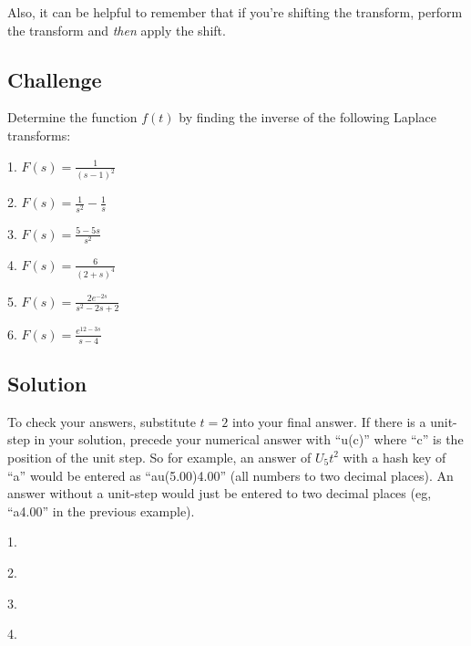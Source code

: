 Also, it can be helpful to remember that if you're shifting the transform, perform the transform and \emph{then} apply the shift.

\subsection*{Challenge}
Determine the function $f(t)$ by finding the inverse of the following Laplace transforms:

1. $\displaystyle F(s)=\frac{1}{(s-1)^2}$

2. $\displaystyle F(s)=\frac{1}{s^2} - \frac{1}{s}$


3. $\displaystyle F(s)=\frac{5-5s}{s^2}$

4. $\displaystyle F(s)=\frac{6}{(2+s)^4}$


5. $\displaystyle F(s)=\frac{2 e^{-2s}}{s^2-2s+2}$

6. $\displaystyle F(s)=\frac{e^{12-3s}}{s-4}$

\subsection*{Solution}
To check your answers, substitute $t=2$ into your final answer. If there is a unit-step in your solution, precede your numerical answer with ``u(c)'' where ``c'' is the position of the unit step. So for example, an answer of $U_5 t^2$ with a hash key of ``a'' would be entered as ``au(5.00)4.00'' (all numbers to two decimal places). An answer without a unit-step would just be entered to two decimal places (eg, ``a4.00'' in the previous example).

1.\\

2.\\


3.\\

4.\\


